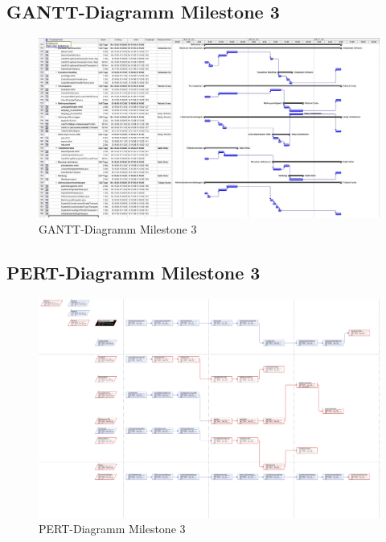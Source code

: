 \subsection{GANTT-Diagramm Milestone 3}
\begin{figure}[h]
	\centering
	\includegraphics[width=1.0\linewidth, angle=90]{Grafiken/Milestone3Gantt}
	\caption{GANTT-Diagramm Milestone 3}
	\label{fig:GANTT-Diagramm Milestone 3}
\end{figure}
\clearpage

\subsection{PERT-Diagramm Milestone 3}
\begin{figure}[h]
	\centering
	\includegraphics[width=1.0\linewidth, angle=90]{Grafiken/Milestone3PERT}
	\caption{PERT-Diagramm Milestone 3}
	\label{fig:PERT-Diagramm Milestone 3}
\end{figure}
\clearpage